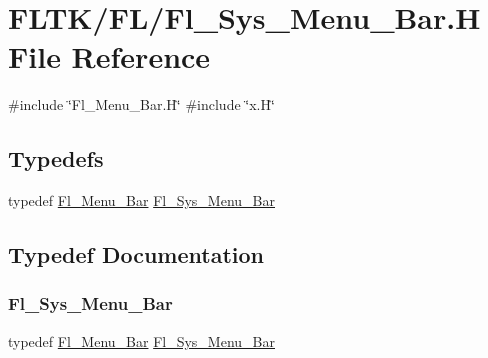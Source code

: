 \hypertarget{_fl___sys___menu___bar_8_h}{}\section{F\+L\+T\+K/\+F\+L/\+Fl\+\_\+\+Sys\+\_\+\+Menu\+\_\+\+Bar.H File Reference}
\label{_fl___sys___menu___bar_8_h}
{\ttfamily \#include \char`\"{}Fl\+\_\+\+Menu\+\_\+\+Bar.\+H\char`\"{}}\newline
{\ttfamily \#include \char`\"{}x.\+H\char`\"{}}\newline
\subsection*{Typedefs}
\begin{DoxyCompactItemize}
\item 
typedef \hyperlink{class_fl___menu___bar}{Fl\+\_\+\+Menu\+\_\+\+Bar} \hyperlink{_fl___sys___menu___bar_8_h_a615bb5494aaeeb4298839e7a7cbcd09d}{Fl\+\_\+\+Sys\+\_\+\+Menu\+\_\+\+Bar}
\end{DoxyCompactItemize}


\subsection{Typedef Documentation}
\mbox{\label{_fl___sys___menu___bar_8_h_a615bb5494aaeeb4298839e7a7cbcd09d}} 
\subsubsection{\texorpdfstring{Fl\+\_\+\+Sys\+\_\+\+Menu\+\_\+\+Bar}{Fl\_Sys\_Menu\_Bar}}
{\footnotesize\ttfamily typedef \hyperlink{class_fl___menu___bar}{Fl\+\_\+\+Menu\+\_\+\+Bar} \hyperlink{_fl___sys___menu___bar_8_h_a615bb5494aaeeb4298839e7a7cbcd09d}{Fl\+\_\+\+Sys\+\_\+\+Menu\+\_\+\+Bar}}

